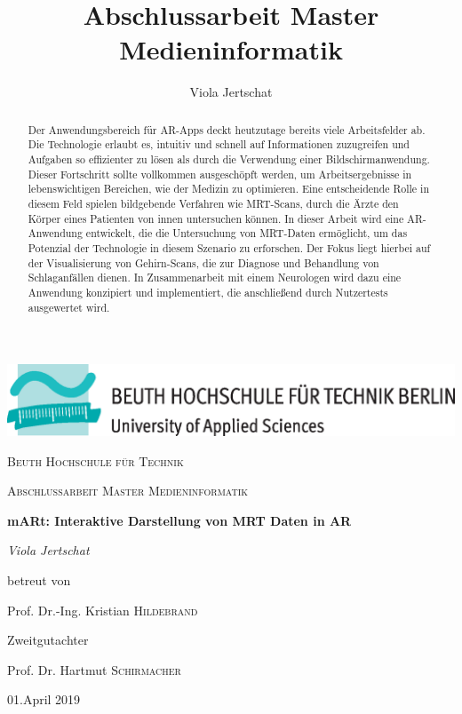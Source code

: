 \documentclass[a4paper,11pt]{report}
\title{Abschlussarbeit Master Medieninformatik}
\author{Viola Jertschat}
\let\oldcite\cite
\renewcommand*\cite[1]{[\oldcite{#1}]}
\begin{document}
\begin{titlepage}
	\centering
	\includegraphics[width=\textwidth]{images/beuthlogo.eps}\par\vspace{1cm}
	{\scshape\LARGE Beuth Hochschule für Technik \par}
	\vspace{1cm}
	{\scshape\Large Abschlussarbeit Master Medieninformatik\par}
	\vspace{1.5cm}
	{\huge\bfseries mARt: Interaktive Darstellung von MRT Daten in AR\par}
	\vspace{2cm}
	{\Large\itshape Viola Jertschat\par}
	\vfill
	betreut von\par
	Prof. Dr.-Ing. Kristian \textsc{Hildebrand}
	
	\vfill
	Zweitgutachter\par
	Prof. Dr. Hartmut \textsc{Schirmacher}

	\vfill

	{\large 01.April 2019\par}
\end{titlepage}

\begin{abstract} 
Der Anwendungsbereich für AR-Apps deckt heutzutage bereits viele Arbeitsfelder ab. Die Technologie erlaubt es, intuitiv und schnell auf Informationen zuzugreifen und Aufgaben so effizienter zu lösen als durch die Verwendung einer Bildschirmanwendung. Dieser Fortschritt sollte vollkommen ausgeschöpft werden, um Arbeitsergebnisse in lebenswichtigen Bereichen, wie der Medizin zu optimieren. 
Eine entscheidende Rolle in diesem Feld spielen bildgebende Verfahren wie MRT-Scans, durch die Ärzte den Körper eines Patienten von innen untersuchen können. 
In dieser Arbeit wird eine AR-Anwendung entwickelt, die die Untersuchung von MRT-Daten ermöglicht, um das Potenzial der Technologie in diesem Szenario zu erforschen. Der Fokus liegt hierbei auf der Visualisierung von Gehirn-Scans, die zur Diagnose und Behandlung von Schlaganfällen dienen. 
In Zusammenarbeit mit einem Neurologen wird dazu eine Anwendung konzipiert und implementiert, die anschließend durch Nutzertests ausgewertet wird.




\end{abstract}
\end{document}
